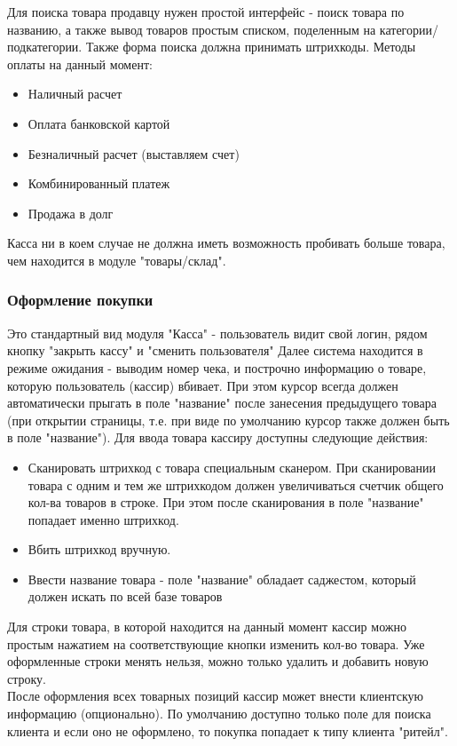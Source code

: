 \documentclass[DIV=calc, paper=a4, fontsize=11pt]{scrartcl} %
\begin{document}
Для поиска товара продавцу нужен простой интерфейс - поиск товара по названию, а также вывод товаров простым списком, поделенным на категории/подкатегории. Также форма поиска должна принимать штрихкоды. Методы оплаты на данный момент:
\begin{itemize}
	\item Наличный расчет
	\item Оплата банковской картой
	\item Безналичный расчет (выставляем счет)
	\item Комбинированный платеж
	\item Продажа в долг
\end{itemize}

Касса ни в коем случае не должна иметь возможность пробивать больше товара, чем находится в модуле "товары/склад".

\subsubsection{Оформление покупки}
Это стандартный вид модуля "Касса" - пользователь видит свой логин, рядом кнопку "закрыть кассу" и "сменить пользователя" 
Далее система находится в режиме ожидания - выводим номер чека, и построчно информацию о товаре, которую пользователь (кассир) вбивает. При этом курсор всегда должен автоматически прыгать в поле "название" после занесения предыдущего товара (при открытии страницы, т.е. при виде по умолчанию курсор также должен быть в поле "название"). Для ввода товара кассиру доступны следующие действия:

\begin{itemize}
	\item Сканировать штрихкод с товара специальным сканером. При сканировании товара с одним и тем же штрихкодом должен увеличиваться счетчик общего кол-ва товаров в строке. При этом после сканирования в поле "название" попадает именно штрихкод.
	\item Вбить штрихкод вручную.
	\item Ввести название товара - поле "название" обладает саджестом, который должен искать по всей базе товаров 
\end{itemize}

Для строки товара, в которой находится на данный момент кассир можно простым нажатием на соответствующие кнопки изменить кол-во товара. Уже оформленные строки менять нельзя, можно только удалить и добавить новую строку.
\\[0.5cm]
После оформления всех товарных позиций кассир может внести клиентскую информацию (опционально). По умолчанию доступно только поле для поиска клиента и если оно не оформлено, то покупка попадает к типу клиента "ритейл". 
\end{document}
